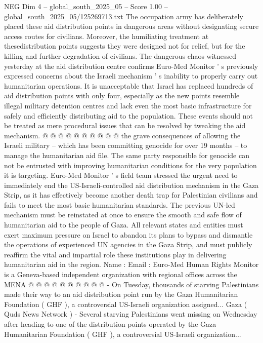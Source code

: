 \begin{textsample}{NEG Dim 4 – global\_south\_2025\_05 – Score 1.00 – global\_south\_2025\_05/125269713.txt}
The occupation army has deliberately placed these aid distribution points in dangerous areas without designating secure access routes for civilians.
Moreover, the humiliating treatment at thesedistribution points suggests they were designed not for relief, but for the killing and further degradation of civilians.
The dangerous chaos witnessed yesterday at the aid distribution centre confirms Euro-Med Monitor ' s previously expressed concerns about the Israeli mechanism ' s inability to properly carry out humanitarian operations.
It is unacceptable that Israel has replaced hundreds of aid distribution points with only four, especially as the new points resemble illegal military detention centres and lack even the most basic infrastructure for safely and efficiently distributing aid to the population.
These events should not be treated as mere procedural issues that can be resolved by tweaking the aid mechanism. @ @ @ @ @ @ @ @ @ @ the grave consequences of allowing the Israeli military -- which has been committing genocide for over 19 months -- to manage the humanitarian aid file.
The same party responsible for genocide can not be entrusted with improving humanitarian conditions for the very population it is targeting.
Euro-Med Monitor ' s field team stressed the urgent need to immediately end the US-Israeli-controlled aid distribution mechanism in the Gaza Strip, as it has effectively become another death trap for Palestinian civilians and fails to meet the most basic humanitarian standards.
The previous UN-led mechanism must be reinstated at once to ensure the smooth and safe flow of humanitarian aid to the people of Gaza.
All relevant states and entities must exert maximum pressure on Israel to abandon its plans to bypass and dismantle the operations of experienced UN agencies in the Gaza Strip, and must publicly reaffirm the vital and impartial role these institutions play in delivering humanitarian aid in the region.
Name : Email : Euro-Med Human Rights Monitor is a Geneva-based independent organization with regional offices across the MENA @ @ @ @ @ @ @ @ @ @ - On Tuesday, thousands of starving Palestinians made their way to an aid distribution point run by the Gaza Humanitarian Foundation ( GHF ), a controversial US-Israeli organization assigned...
Gaza ( Quds News Network ) - Several starving Palestinians went missing on Wednesday after heading to one of the distribution points operated by the Gaza Humanitarian Foundation ( GHF ), a controversial US-Israeli organization...

\end{textsample}
